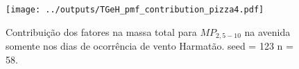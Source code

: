 \begin{landscape}
  \begin{figure}
    \centering
    \begin{minipage}[b]{0.45\linewidth}
      \texttt{[image: ../outputs/TGeH\_pmf\_contribution\_pizza4.pdf]}
      \caption{Contribuição dos fatores na massa total para $MP_{2,5-10}$ na avenida
               somente nos dias de ocorrência de vento Harmatão. seed = 123 n = 58.
               \label{fig:TGeH_contribution4}}
    \end{minipage}%
    \hspace{0.5cm}
    \begin{minipage}[b]{0.45\linewidth}
      
    \end{minipage}
  \end{figure}
\end{landscape}
